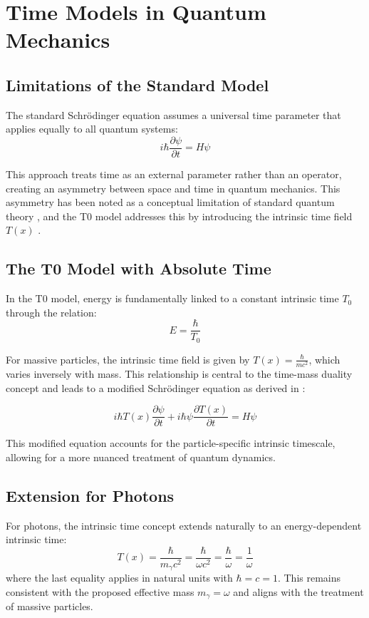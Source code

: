 \documentclass[12pt,a4paper]{article}
\newcommand{\Tfield}{T(x)}
\begin{document}
	\section{Time Models in Quantum Mechanics}
	\subsection{Limitations of the Standard Model}
	The standard Schrödinger equation assumes a universal time parameter that applies equally to all quantum systems:
	\begin{equation}
		i\hbar\frac{\partial\psi}{\partial t} = H\psi
	\end{equation}
	
	This approach treats time as an external parameter rather than an operator, creating an asymmetry between space and time in quantum mechanics. This asymmetry has been noted as a conceptual limitation of standard quantum theory \cite{feynman}, and the T0 model addresses this by introducing the intrinsic time field \(\Tfield\) \cite{pascher_erweiterung_2025}.
	
	\subsection{The T0 Model with Absolute Time}
	In the T0 model, energy is fundamentally linked to a constant intrinsic time \(T_0\) through the relation:
	\begin{equation}
		E = \frac{\hbar}{T_0}
	\end{equation}
	
	For massive particles, the intrinsic time field is given by \(\Tfield = \frac{\hbar}{m c^2}\), which varies inversely with mass. This relationship is central to the time-mass duality concept and leads to a modified Schrödinger equation as derived in \cite{pascher_lagrange_2025}:
	
	\begin{equation}
		i\hbar \Tfield \frac{\partial\psi}{\partial t} + i\hbar \psi \frac{\partial \Tfield}{\partial t} = H\psi
	\end{equation}
	
	This modified equation accounts for the particle-specific intrinsic timescale, allowing for a more nuanced treatment of quantum dynamics.
	
	\subsection{Extension for Photons}
	For photons, the intrinsic time concept extends naturally to an energy-dependent intrinsic time:
	\begin{equation}
		\Tfield = \frac{\hbar}{m_\gamma c^2} = \frac{\hbar}{\omega c^2} = \frac{\hbar}{\omega} = \frac{1}{\omega}
	\end{equation}
	where the last equality applies in natural units with \(\hbar = c = 1\). This remains consistent with the proposed effective mass \(m_\gamma = \omega\) and aligns with the treatment of massive particles.
	
\end{document}
